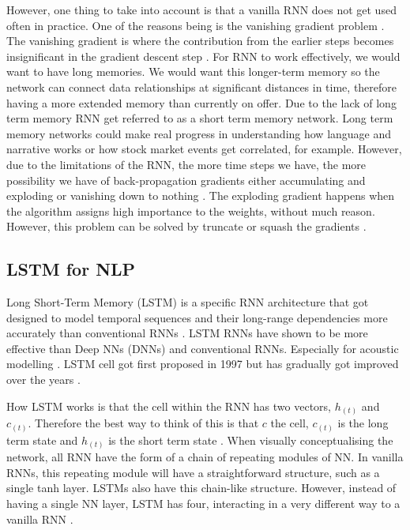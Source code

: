 \documentclass[a4paper,10pt]{article}
\begin{document}
	However, one thing to take into account is that a vanilla RNN does not get used often in practice. One of the reasons being is the vanishing gradient problem \cite{geron2019hands}. The vanishing gradient is where the contribution from the earlier steps becomes insignificant in the gradient descent step \cite{rnn_lstm_explained}. For RNN to work effectively, we would want to have long memories. We would want this longer-term memory so the network can connect data relationships at significant distances in time, therefore having a more extended memory than currently on offer. Due to the lack of long term memory RNN get referred to as a short term memory network. Long term memory networks could make real progress in understanding how language and narrative works or how stock market events get correlated, for example. However, due to the limitations of the RNN, the more time steps we have, the more possibility we have of back-propagation gradients either accumulating and exploding or vanishing down to nothing \cite{adv_in_ml}. The exploding gradient happens when the algorithm assigns high importance to the weights, without much reason. However, this problem can be solved by truncate or squash the gradients \cite{rnn_lstm_explained}.
	

\subsection{LSTM for NLP}
	
	Long Short-Term Memory (LSTM) is a specific RNN architecture that got designed to model temporal sequences and their long-range dependencies more accurately than conventional RNNs \cite{sak2014long}. LSTM RNNs have shown to be more effective than Deep NNs (DNNs) and conventional RNNs. Especially for acoustic modelling \cite{sak2014long}. LSTM cell got first proposed in 1997 \cite{hochreiter1997long} but has gradually got improved over the years \cite{geron2019hands, sak2014long, zaremba2014recurrent}.  
	
	How LSTM works is that the cell within the RNN has two vectors, $h_{(t)}$ and $c_{(t)}$. Therefore the best way to think of this is that $c$ the cell, $c_{(t)}$ is the long term state and $h_{(t)}$ is the short term state \cite{geron2019hands}. When visually conceptualising the network, all RNN have the form of a chain of repeating modules of NN. In vanilla RNNs, this repeating module will have a straightforward structure, such as a single tanh layer. LSTMs also have this chain-like structure. However, instead of having a single NN layer, LSTM has four, interacting in a very different way to a vanilla RNN \cite{lstm_networks}. 
	
\end{document}
